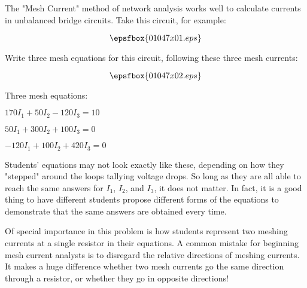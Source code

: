 

The "Mesh Current" method of network analysis works well to calculate currents in unbalanced bridge circuits.  Take this circuit, for example:

$$\epsfbox{01047x01.eps}$$

Write three mesh equations for this circuit, following these three mesh currents:

$$\epsfbox{01047x02.eps}$$







Three mesh equations:

\vskip 10pt

$170I_1 + 50I_2 - 120I_3 = 10$

\vskip 10pt

$50I_1 + 300I_2 + 100I_3 = 0$

\vskip 10pt

$-120I_1 + 100I_2 + 420I_3 = 0$







Students' equations may not look exactly like these, depending on how they "stepped" around the loops tallying voltage drops.  So long as they are all able to reach the same answers for $I_1$, $I_2$, and $I_3$, it does not matter.  In fact, it is a good thing to have different students propose different forms of the equations to demonstrate that the same answers are obtained every time.

Of special importance in this problem is how students represent two meshing currents at a single resistor in their equations.  A common mistake for beginning mesh current analysts is to disregard the relative directions of meshing currents.  It makes a huge difference whether two mesh currents go the same direction through a resistor, or whether they go in opposite directions!



